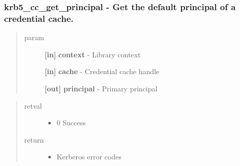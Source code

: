 \documentclass[letterpaper,10pt,english]{sphinxmanual}
\begin{document}
\subsubsection{krb5\_cc\_get\_principal -  Get the default principal of a credential cache.}
\label{appdev/refs/api/krb5_cc_get_principal:krb5-cc-get-principal-get-the-default-principal-of-a-credential-cache}\label{appdev/refs/api/krb5_cc_get_principal::doc}

\begin{fulllineitems}
\label{appdev/refs/api/krb5_cc_get_principal:krb5_cc_get_principal}
\end{fulllineitems}

\begin{quote}\begin{description}
\item[{param}] \leavevmode
\textbf{{[}in{]}} \textbf{context} - Library context

\textbf{{[}in{]}} \textbf{cache} - Credential cache handle

\textbf{{[}out{]}} \textbf{principal} - Primary principal

\end{description}\end{quote}
\begin{quote}\begin{description}
\item[{retval}] \leavevmode\begin{itemize}
\item {} 
0   Success

\end{itemize}

\item[{return}] \leavevmode\begin{itemize}
\item {} 
Kerberos error codes

\end{itemize}

\end{description}\end{quote}
\end{document}

